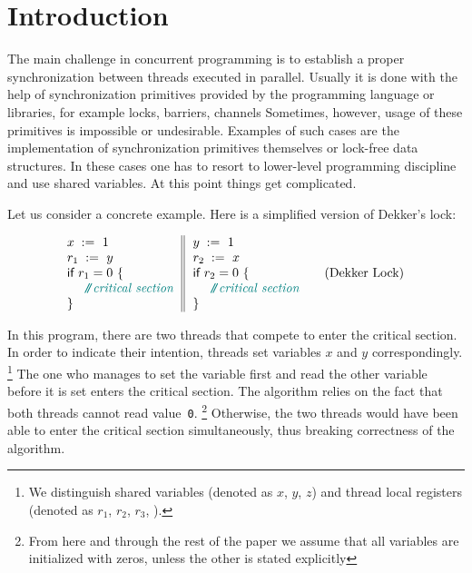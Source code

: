 \section{Introduction}
\label{sec:intro}

The main challenge in concurrent programming is 
to establish a proper synchronization between threads executed in parallel.     
Usually it is done with the help of synchronization primitives
provided by the programming language or libraries,
for example locks, barriers, channels \etc
Sometimes, however, usage of these primitives is impossible or undesirable. 
Examples of such cases are the implementation 
of synchronization primitives themselves
or lock-free data structures.
In these cases one has to resort to 
lower-level programming discipline and use shared variables. 
At this point things get complicated.


Let us consider a concrete example.
Here is a simplified version of Dekker's lock:

\begin{equation*}
\inarrII{
  \writeInst{}{x}{1} \\
  \readInst{}{r_1}{y}  \\
  \kw{if} {r_1 = 0} ~\{ \\
  ~~ \comment{critical section} \\
  \}
}{
  \writeInst{}{y}{1} \\
  \readInst{}{r_2}{x}  \\
  \kw{if} {r_2 = 0} ~\{ \\
  ~~ \comment{critical section} \\
  \}
}
\tag{Dekker Lock}\label{ex:Dekker}
\end{equation*}

In this program, there are two threads that compete to enter the critical section.
In order to indicate their intention, threads set 
variables $x$ and $y$ correspondingly.%
\footnote{We distinguish shared variables 
(denoted as $x$, $y$, $z$) and thread local registers 
(denoted as $r_1$, $r_2$, $r_3$, \etc).}
The one who manages to set the variable first 
and read the other variable before it is set
enters the critical section.
The algorithm relies on the fact that both threads cannot read value~\texttt{0}.%
\footnote{From here and through the rest of the paper we assume that all 
variables are initialized with zeros, unless the other is stated explicitly}
Otherwise, the two threads would have been able 
to enter the critical section simultaneously, 
thus breaking correctness of the algorithm.

